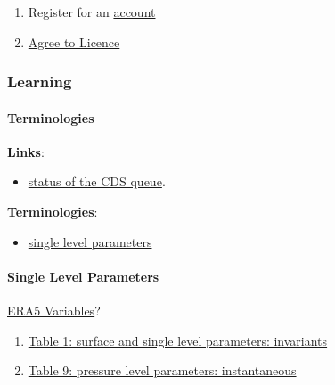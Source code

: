 \documentclass[
]{book}
\providecommand{\tightlist}{%
  \setlength{\itemsep}{0pt}\setlength{\parskip}{0pt}}
\begin{document}
\begin{enumerate}
\def\labelenumi{\arabic{enumi}.}
\tightlist
\item
  Register for an \href{cds.climate.copernicus.eu}{account}
\item
  \href{https://cds.climate.copernicus.eu/cdsapp/\#!/terms/licence-to-use-copernicus-products}{Agree to Licence}
\end{enumerate}

\hypertarget{learning}{%
\subsubsection{Learning}\label{learning}}

\hypertarget{terminologies}{%
\paragraph{Terminologies}\label{terminologies}}

\textbf{Links}:

\begin{itemize}
\tightlist
\item
  \href{https://cds.climate.copernicus.eu/live/queue}{status of the CDS queue}.
\end{itemize}

\textbf{Terminologies}:

\begin{itemize}
\tightlist
\item
  \href{}{single level parameters}
\end{itemize}

\hypertarget{single-level-parameters}{%
\paragraph{Single Level Parameters}\label{single-level-parameters}}

\href{https://confluence.ecmwf.int/display/CKB/ERA5?src=breadcrumbs-parent}{ERA5 Variables}?

\begin{enumerate}
\def\labelenumi{\arabic{enumi}.}
\tightlist
\item
  \href{https://confluence.ecmwf.int/pages/viewpage.action?pageId=82870405\#ERA5:datadocumentation-Table1}{Table 1: surface and single level parameters: invariants}
\item
  \href{https://confluence.ecmwf.int/pages/viewpage.action?pageId=82870405\#ERA5:datadocumentation-Table9}{Table 9: pressure level parameters: instantaneous}
\end{enumerate}
\end{document}
